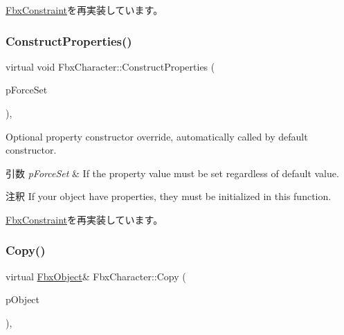 \hyperlink{class_fbx_constraint_a6350b98fa8717caf9167c5513824310c}{Fbx\+Constraint}を再実装しています。

\mbox{\label{class_fbx_character_ae66db4ff3c527db3c47064c700ce179a}} 
\subsubsection{\texorpdfstring{Construct\+Properties()}{ConstructProperties()}}
{\footnotesize\ttfamily virtual void Fbx\+Character\+::\+Construct\+Properties (\begin{DoxyParamCaption}\item[{bool}]{p\+Force\+Set }\end{DoxyParamCaption})\hspace{0.3cm}{\ttfamily [protected]}, {\ttfamily [virtual]}}

Optional property constructor override, automatically called by default constructor. 
\begin{DoxyParams}{引数}
{\em p\+Force\+Set} & If the property value must be set regardless of default value. \\
\hline
\end{DoxyParams}
\begin{DoxyRemark}{注釈}
If your object have properties, they must be initialized in this function. 
\end{DoxyRemark}


\hyperlink{class_fbx_constraint_a0470a25b813b337d07a03ce4b97b44f8}{Fbx\+Constraint}を再実装しています。

\mbox{\label{class_fbx_character_a54ea68d64fe0dc2e052e2b5e475fa170}} 
\subsubsection{\texorpdfstring{Copy()}{Copy()}}
{\footnotesize\ttfamily virtual \hyperlink{class_fbx_object}{Fbx\+Object}\& Fbx\+Character\+::\+Copy (\begin{DoxyParamCaption}\item[{const \hyperlink{class_fbx_object}{Fbx\+Object} \&}]{p\+Object }\end{DoxyParamCaption})\hspace{0.3cm}{\ttfamily [protected]}, {\ttfamily [virtual]}}

